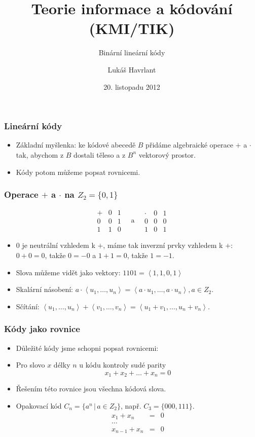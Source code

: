 \documentclass{beamer}
\title{Teorie informace a kódování (KMI/TIK)}
\subtitle{Binární lineární kódy}
\author{Lukáš Havrlant}
\date{20. listopadu 2012}
\institute{Univerzita Palackého}
\newcommand{\sep}{\,|\,}
\newenvironment{itemizex}%
  {\large \begin{itemize}%
    \setlength{\itemsep}{8pt}%
    \setlength{\parskip}{8pt}}%
  {\end{itemize}}
\begin{document}
\begin{frame}[t,plain]
\titlepage
\end{frame}



\begin{frame}[t,fragile]\frametitle{Lineární kódy} 
    \begin{itemizex}
        \item Základní myšlenka: ke kódové abecedě $B$ přidáme algebraické operace $+$ a $\cdot$ tak, abychom z $B$ dostali těleso a z $B^n$ vektorový prostor.
        \item Kódy potom můžeme popsat rovnicemi. 
    \end{itemizex}
\end{frame}


\begin{frame}[t,fragile]\frametitle{Operace $+$ a $\cdot$ na $Z_2=\{0, 1\}$}
$$
\begin{array}{c|cc}
+&0&1\\\hline
0&0&1\\
1&1&0
\end{array}
\quad\mbox{a}\quad
\begin{array}{c|cc}
\cdot&0&1\\\hline
0&0&0\\
1&0&1
\end{array}
$$

\begin{itemizex}
    \item 0 je neutrální vzhledem k $+$, máme tak inverzní prvky vzhledem k $+$: $0+0=0$, takže $0=-0$ a $1+1=0$, takže $1=-1$.
    \item Slova můžeme vidět jako vektory: $1101 = \left<1,1,0,1\right>$
    \item Skalární násobení: $a\cdot\left<u_1, \dots, u_n\right> = \left<a\cdot u_1, \dots, a\cdot u_n\right>, a\in Z_2$.
    \item Sčítání: $\left<u_1, \dots, u_n\right> + \left<v_1, \dots, v_n\right> = \left<u_1+v_1, \dots, u_n+v_n\right>$.
\end{itemizex}
\end{frame}



\begin{frame}[t,fragile]\frametitle{Kódy jako rovnice} 
    \begin{itemizex}
        \item Důležité kódy jsme schopni popsat rovnicemi:
        \item Pro slovo $x$ délky $n$ u kódu kontroly sudé parity
$$
x_1+x_2+\dots+x_n=0
$$
        \item Řešením této rovnice jsou všechna kódová slova.
        \item Opakovací kód $C_n = \{a^n\sep a\in Z_2\}$, např. $C_3=\{000, 111\}$.
  \begin{eqnarray*}
  x_1+x_n&=&0\\
  \dots\\
  x_{n-1}+x_n&=&0
  \end{eqnarray*}
    \end{itemizex}
\end{frame}
\end{document}
